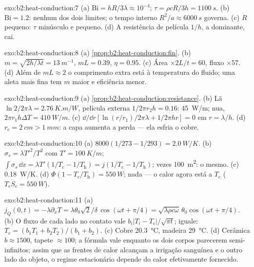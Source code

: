 \begin{solution}{exo:b2:heat-conduction:7}
(a) $\mathrm{Bi} = hR/3\lambda \approx 10^{-4}$; $\tau = \rho cR/3h = \qty{1100}{s}$.
(b) $\mathrm{Bi} = 1.2$: nenhum dos dois limites; o tempo interno $R^2/a \approx
\qty{6000}{s}$ governa. (c) $R$ pequeno: $\tau$ minúsculo e  pequeno.
(d) A resistência de película $1/h$, a dominante, cai.
\end{solution}

\begin{solution}{exo:b2:heat-conduction:8}
(a) \cref{prop:b2:heat-conduction:fin}. (b) $m = \sqrt{2h/\lambda t} =
\qty{13}{m^{-1}}$, $mL = 0.39$, $\eta = 0.95$. (c) Área $\times 2L/t = 60$, fluxo
$\times 57$. (d) Além de $mL \approx 2$ o comprimento extra está à temperatura
do fluido; uma aleta mais fina tem $m$ maior e eficiência menor.
\end{solution}

\begin{solution}{exo:b2:heat-conduction:9}
(a) \cref{prop:b2:heat-conduction:resistance}. (b) Lã $\ln 2/2\pi\lambda =
\qty{2.76}{K.m/W}$, película externa $1/2\pi r_2h = 0.16$: \qty{45}{W/m}; nua,
$2\pi r_1h\Delta T = \qty{410}{W/m}$. (c) $\dd/\dd r[\ln(r/r_1)/2\pi\lambda + 1/2\pi hr]
= 0$ em $r = \lambda/h$. (d) $r_{\text{c}} = \qty{2}{cm} > \qty{1}{mm}$: a capa
aumenta a perda --- ela esfria o cobre.
\end{solution}

\begin{solution}{exo:b2:heat-conduction:10}
(a) $8000(1/273 - 1/293) = \qty{2.0}{W/K}$. (b) $\sigma_s = \lambda T'^2/T^2$ com
$T' = \qty{100}{K/m}$; $\int\sigma_s\,\dd x = \lambda T'(1/T_{\text{c}} - 1/T_{\text{h}})
= j(1/T_{\text{c}} - 1/T_{\text{h}})$; vezes \qty{100}{m^2}: o mesmo. (c)
\qty{0.18}{W/K}. (d) $\Phi(1 - T_{\text{c}}/T_{\text{h}}) = \qty{550}{W}$; nada
--- o calor agora está a $T_{\text{c}}$ ($T_{\text{c}}\dot S_{\text{c}} = \qty{550}{W}$).
\end{solution}

\begin{solution}{exo:b2:heat-conduction:11}
(a) $j_Q(0,t) = -\lambda\partial_xT = \lambda\theta_0\sqrt2/\delta\,\cos(\omega t +
\pi/4) = \sqrt{\lambda\rho c\omega}\,\theta_0\cos(\omega t + \pi/4)$. (b) O fluxo de
cada lado no contato vale $b_i|T_i - T_{\text{c}}|/\sqrt{\pi t}$; iguale:
$T_{\text{c}} = (b_1T_1 + b_2T_2)/(b_1 + b_2)$. (c) Cobre \qty{20.3}{\celsius},
madeira \qty{29}{\celsius}. (d) Cerâmica $b \approx 1500$, tapete $\approx 100$; a
fórmula vale enquanto os dois corpos parecerem semi-infinitos; assim que as frentes
de calor alcançam a irrigação sanguínea e o outro lado do objeto, o regime
estacionário depende do calor efetivamente fornecido.
\end{solution}

